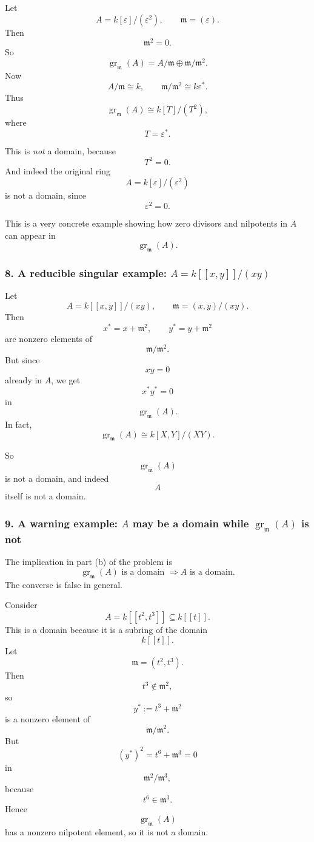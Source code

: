 \documentclass[12pt,a4paper]{article}
\theoremstyle{notespace}
\theoremstyle{definition}
\begin{document}
Let
\[
A=k[\varepsilon]/(\varepsilon^2),
\qquad
\mathfrak m=(\varepsilon).
\]
Then
\[
\mathfrak m^2=0.
\]
So
\[
\operatorname{gr}_{\mathfrak m}(A)
=
A/\mathfrak m \oplus \mathfrak m/\mathfrak m^2.
\]
Now
\[
A/\mathfrak m \cong k,
\qquad
\mathfrak m/\mathfrak m^2 \cong k\varepsilon^*.
\]
Thus
\[
\operatorname{gr}_{\mathfrak m}(A)\cong k[T]/(T^2),
\]
where
\[
T=\varepsilon^*.
\]

This is \emph{not} a domain, because
\[
T^2=0.
\]
And indeed the original ring
\[
A=k[\varepsilon]/(\varepsilon^2)
\]
is not a domain, since
\[
\varepsilon^2=0.
\]

This is a very concrete example showing how zero divisors and nilpotents in \(A\) can appear in
\[
\operatorname{gr}_{\mathfrak m}(A).
\]

\subsubsection{8. A reducible singular example: \(A=k[[x,y]]/(xy)\)}

Let
\[
A=k[[x,y]]/(xy),
\qquad
\mathfrak m=(x,y)/(xy).
\]
Then
\[
x^*=x+\mathfrak m^2,
\qquad
y^*=y+\mathfrak m^2
\]
are nonzero elements of
\[
\mathfrak m/\mathfrak m^2.
\]
But since
\[
xy=0
\]
already in \(A\), we get
\[
x^*y^*=0
\]
in
\[
\operatorname{gr}_{\mathfrak m}(A).
\]
In fact,
\[
\operatorname{gr}_{\mathfrak m}(A)\cong k[X,Y]/(XY).
\]

So
\[
\operatorname{gr}_{\mathfrak m}(A)
\]
is not a domain, and indeed
\[
A
\]
itself is not a domain.

\subsubsection{9. A warning example: \(A\) may be a domain while \(\operatorname{gr}_{\mathfrak m}(A)\) is not}

The implication in part (b) of the problem is
\[
\operatorname{gr}_{\mathfrak m}(A)\text{ is a domain } \Longrightarrow A\text{ is a domain.}
\]
The converse is false in general.

Consider
\[
A=k[[t^2,t^3]]\subseteq k[[t]].
\]
This is a domain because it is a subring of the domain
\[
k[[t]].
\]
Let
\[
\mathfrak m=(t^2,t^3).
\]
Then
\[
t^3\notin \mathfrak m^2,
\]
so
\[
y^*:=t^3+\mathfrak m^2
\]
is a nonzero element of
\[
\mathfrak m/\mathfrak m^2.
\]
But
\[
(y^*)^2=t^6+\mathfrak m^3=0
\]
in
\[
\mathfrak m^2/\mathfrak m^3,
\]
because
\[
t^6\in \mathfrak m^3.
\]
Hence
\[
\operatorname{gr}_{\mathfrak m}(A)
\]
has a nonzero nilpotent element, so it is not a domain.
\end{document}
